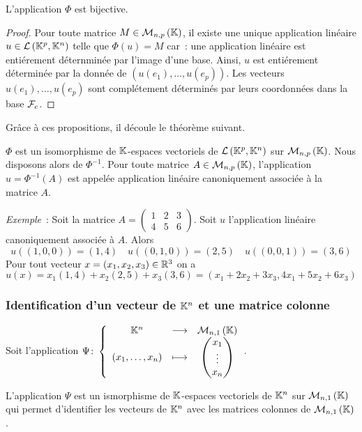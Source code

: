 \begin{prop}
  L'application \(\Phi\) est bijective.
\end{prop}
\begin{proof}
  Pour toute matrice \(M \in \mathcal{M}_{n,p}\left(\mathbb{K}\right)\), il existe une unique application linéaire \(u \in \mathcal{L}\left(\mathbb{K}^p,\mathbb{K}^n\right)\) telle que \(\Phi(u)=M\) car~: une application linéaire est entiérement déternminée par l'image d'une base. Ainsi, \(u\) est entiérement déterminée par la donnée de \((u(e_1), \ldots, u(e_p))\). Les vecteurs \(u(e_1), \ldots, u(e_p)\) sont complétement déterminés par leurs coordonnées dans la base \(\mathcal{F}_c\).
\end{proof}

Grâce à ces propositions, il découle le théorème suivant.
\begin{theo}
  \(\Phi\) est un isomorphisme de \(\mathbb{K}\)-espaces vectoriels de \(\mathcal{L}\left(\mathbb{K}^p,\mathbb{K}^n\right)\) sur \(\mathcal{M}_{n,p}\left(\mathbb{K}\right)\). Nous disposons alors de \(\Phi^{-1}\). Pour toute matrice \(A \in \mathcal{M}_{n,p}\left(\mathbb{K}\right)\), l'application \(u=\Phi^{-1}(A)\) est appelée application linéaire canoniquement associée à la matrice \(A\).
\end{theo}

\emph{Exemple}~: Soit la matrice \(A=\begin{pmatrix} 1 & 2 & 3 \\ 4 & 5 & 6 \end{pmatrix}\). Soit \(u\) l'application linéaire canoniquement associée à \(A\). Alors
\begin{equation}
  u((1,0,0))=(1,4) \quad u((0,1,0))=(2,5) \quad u((0,0,1))=(3,6)
\end{equation}
Pour tout vecteur \(x=(x_1,x_2,x_3) \in \mathbb{R}^3\) on a
\begin{equation}
  u(x)=x_1(1,4) + x_2(2,5) +x_3(3,6)=(x_1+2x_2+3x_3, 4x_1+5x_2+6x_3)
\end{equation}

\subsubsection{Identification d'un vecteur de \(\mathbb{K}^n\) et une matrice colonne}

Soit l'application \(\Psi\colon \left\{\begin{array}{ccc} \mathbb{K}^n & \longrightarrow &\mathcal{M}_{n,1}\left(\mathbb{K}\right)\\ (x_1,\ldots,x_n) & \longmapsto & \begin{pmatrix}x_1 \\ \vdots \\ x_n \end{pmatrix} \end{array} \right.\).

\begin{theo}
  L'application \(\Psi\) est un ismorphisme de \(\mathbb{K}\)-espaces vectoriels de \(\mathbb{K}^n\) sur \(\mathcal{M}_{n,1}\left(\mathbb{K}\right)\) qui permet d'identifier les vecteurs de \(\mathbb{K}^n\) avec les matrices colonnes de \(\mathcal{M}_{n,1}\left(\mathbb{K}\right)\).
\end{theo}


